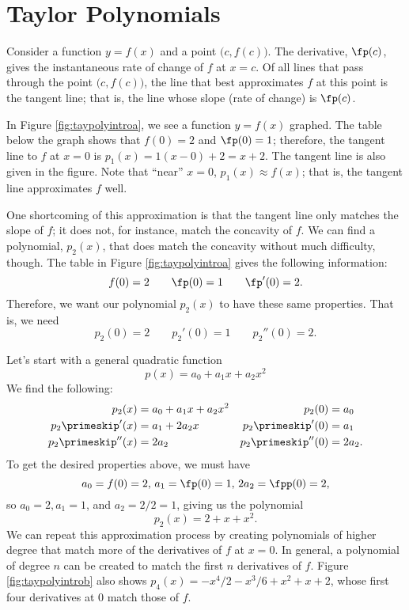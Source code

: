 \section{Taylor Polynomials}\label{sec:taylor_poly}

Consider a function $y=f(x)$ and a point $\big(c,f(c)\big)$. The derivative, $\fp(c)$, gives the instantaneous rate of change of $f$ at $x=c$. Of all lines that pass through the point $\big(c,f(c)\big)$, the line that best approximates $f$ at this point is the tangent line; that is, the line whose slope (rate of change) is $\fp(c)$.

In Figure \ref{fig:taypolyintroa}, we see a function $y=f(x)$ graphed. The table below the graph shows that $f(0)=2$ and $\fp(0) = 1$; therefore, the tangent line to $f$ at $x=0$ is $p_1(x) = 1(x-0)+2 = x+2$. The tangent line is also given in the figure. Note that ``near'' $x=0$, $p_1(x) \approx f(x)$; that is, the tangent line approximates $f$ well.


One shortcoming of this approximation is that the tangent line only matches the slope of $f$; it does not, for instance, match the concavity of $f$. We can find a polynomial, $p_2(x)$, that does match the concavity without much difficulty, though. The table in Figure \ref{fig:taypolyintroa} gives the following information:
\[
f(0) = 2 \qquad \fp(0) = 1\qquad \fp'(0) = 2.
\]
Therefore, we want our polynomial $p_2(x)$ to have these same properties. That is, we need 
\[
p_2(0) = 2 \qquad p_2'(0) = 1 \qquad p_2''(0) = 2.
\]

Let's start with a general quadratic function
\[
p(x) = a_0+a_1x+a_2x^2
\]
We find the following:
\begin{align*}
p_2(x) &= a_0+a_1x+a_2x^2 & p_2(0)&=a_0\\
p_2\primeskip '(x) &= a_1+2a_2x & p_2\primeskip '(0) &= a_1\\
p_2\primeskip ''(x) & = 2a_2 & p_2\primeskip''(0) & = 2a_2.
\end{align*}
To get the desired properties above, we must have 
\[
a_0 = f(0) = 2,\, a_1 = \fp(0) = 1,\, 2a_2 = \fpp(0) = 2,
\]
so $a_0=2, a_1=1$, and $a_2 = 2/2=1$, giving us the polynomial
\[
p_2(x) = 2+x+x^2.
\]
We can repeat this approximation process by creating polynomials of higher degree that match more of the derivatives of $f$ at $x=0$. In general, a polynomial of degree $n$ can be created to match the first $n$ derivatives of $f$. Figure \ref{fig:taypolyintrob} also shows $p_4(x)= -x^4/2-x^3/6+x^2+x+2$, whose first four derivatives at 0 match those of $f$. 


